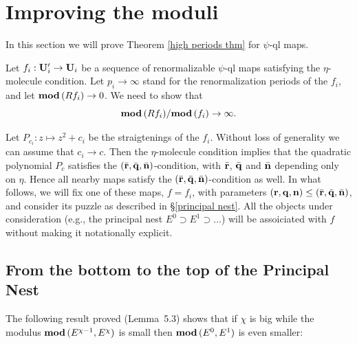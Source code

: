 
\section{Improving the moduli}\label{moduli}

In this section we will prove Theorem \ref{high periods thm} for $\psi$-ql maps. 

Let $f_i: {\mathbf{U}}_i' \rightarrow {\mathbf{U}}_i$ be a sequence of renormalizable $\psi$-ql maps
satisfying the $\eta$-molecule condition.
Let $p_i\to \infty$ stand for the renormalization periods of the $f_i$,
and let ${ \mathbf{mod}\, } (R f_i)\to 0$.
We need to show that 
$$
        { \mathbf{mod}\, } (R f_i)/ { \mathbf{mod}\, } (f_i)\to \infty.
$$

Let $P_{c_i}: z\mapsto z^2 + c_i$ be the straigtenings of the $f_i$.
Without loss of generality we can assume that $c_i\to c$.
Then the $\eta$-molecule condition implies 
that the quadratic polynomial $P_c$ satisfies the $(\bar{{\mathbf{r}}}, \bar{{\mathbf{q}}}, \bar{{\mathbf{n}}})$-condition,
with  $\bar{{\mathbf{r}}}$, $\bar{{\mathbf{q}}}$ and $\bar{{\mathbf{n}}}$ depending only on $\eta $.    
Hence all nearby maps satisfy the $(\bar{{\mathbf{r}}}, \bar{{\mathbf{q}}}, \bar{{\mathbf{n}}})$-condition as well.  
%
In what follows, we will fix one of these maps, $f=f_i$, with parameters $({\mathbf{r}},{\mathbf{q}},{\mathbf{n}})\leq (\bar{{\mathbf{r}}}, \bar{{\mathbf{q}}}, \bar{{\mathbf{n}}})$, 
and consider its puzzle as described in \S \ref{principal nest}.   
All the objects under consideration (e.g., the principal nest $E^0\supset E^1\supset\dots$)
will be assoiciated with $f$ without making it notationally explicit.




\subsection{From the bottom to the top of the Principal Nest}

The following result proved  \cite{decorations} (Lemma~5.3)  
shows that if $\chi$ is big while the modulus ${ \mathbf{mod}\, }(E^{\chi-1}, E^\chi)$ 
is small then  ${ \mathbf{mod}\, }(E^0, E^1)$ is even smaller:



